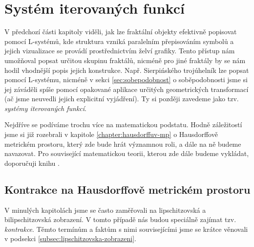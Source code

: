 \section{Systém iterovaných funkcí}\label{sec:ifs}

V předchozí části kapitoly viděli, jak lze fraktální objekty efektivně popisovat pomocí L-systémů, kde struktura vzniká paralelním přepisováním symbolů a jejich vizualizace se provádí prostřednictvím želví grafiky. Tento přístup nám umožňoval popsat určitou skupinu fraktálů, nicméně pro jiné fraktály by se nám hodil vhodnější popis jejich konstrukce. Např. Sierpińského trojúhelník lze popsat pomocí L-systému, nicméně v sekci \ref{sec:sobepodobnost} o soběpodobnosti jsme si jej záváděli spíše pomocí opakované aplikace určitých geometrických transformací (ač jsme neuvedli jejich explicitní vyjádření). Ty si později zavedeme jako tzv. \emph{systémy iterovaných funkcí}.

Nejdříve se podíváme trochu více na matematickou podstatu. Hodně záležitostí jsme si již rozebrali v kapitole \ref{chapter:hausdorffuv-mp} o Hausdorffově metrickém prostoru, který zde bude hrát významnou roli, a dále na ně budeme navazovat. Pro související matematickou teorii, kterou zde dále budeme vykládat, doporučuji knihu \cite{Barnsley1993}.

\subsection{Kontrakce na Hausdorffově metrickém prostoru}\label{subsec:hausdorffuv-mp-kontrakce}

V minulých kapitolách jsme se často zaměřovali na lipschitzovská a bilipschitzovská zobrazení. V tomto případě nás budou speciálně zajímat tzv. \emph{kontrakce}. Těmto termínům a faktům s nimi souvisejícími jsme se krátce věnovali v podsekci \ref{subsec:lipschitzovska-zobrazeni}.


